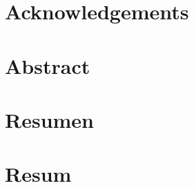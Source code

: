 \cleartorecto
\chapter*{Acknowledgements}



\cleartorecto
\chapter{Abstract}



\cleartorecto
{}
\chapter*{Resumen}



\cleartorecto
{}
\chapter*{Resum}



%

